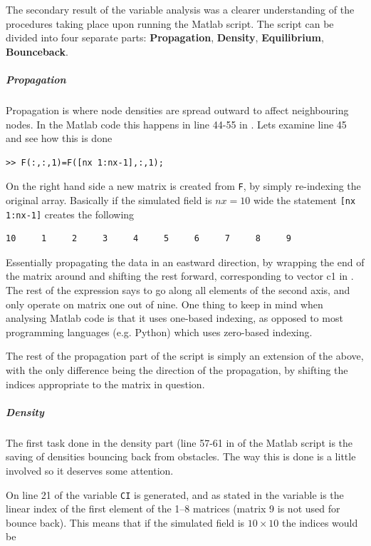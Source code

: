 The secondary result of the variable analysis was a clearer understanding of the procedures taking place upon running the Matlab script. The script can be divided into four separate parts: \textbf{Propagation}, \textbf{Density}, \textbf{Equilibrium}, \textbf{Bounceback}.

\subparagraph{Propagation} 
Propagation is where node densities are spread outward to affect neighbouring nodes. In the Matlab code this happens in line 44-55 in . Lets examine line 45 and see how this is done

\begin{verbatim}
>> F(:,:,1)=F([nx 1:nx-1],:,1);
\end{verbatim}

On the right hand side a new matrix is created from \texttt{F}, by simply re-indexing the original array. Basically if the simulated field is $nx=10$ wide the statement \texttt{[nx 1:nx-1]} creates the following

\begin{verbatim}
10     1     2     3     4     5     6     7     8     9
\end{verbatim}

Essentially propagating the data in an eastward direction, by wrapping the end of the matrix around and shifting the rest forward, corresponding to vector c1 in . The rest of the expression says to go along all elements of the second axis, and only operate on matrix one out of nine. One thing to keep in mind when analysing Matlab code is that it uses one-based indexing, as opposed to most programming languages (e.g. Python) which uses zero-based indexing.

The rest of the propagation part of the script is simply an extension of the above, with the only difference being the direction of the propagation, by shifting the indices appropriate to the matrix in question.

\subparagraph*{Density}
The first task done in the density part (line 57-61 in  of the Matlab script is the saving of densities bouncing back from obstacles. The way this is done is a little involved so it deserves some attention.

On line 21 of  the variable \texttt{CI} is generated, and as stated in  the variable is the linear index of the first element of the 1--8 matrices (matrix 9 is not used for bounce back). This means that if the simulated field is $10\times10$ the indices would be


